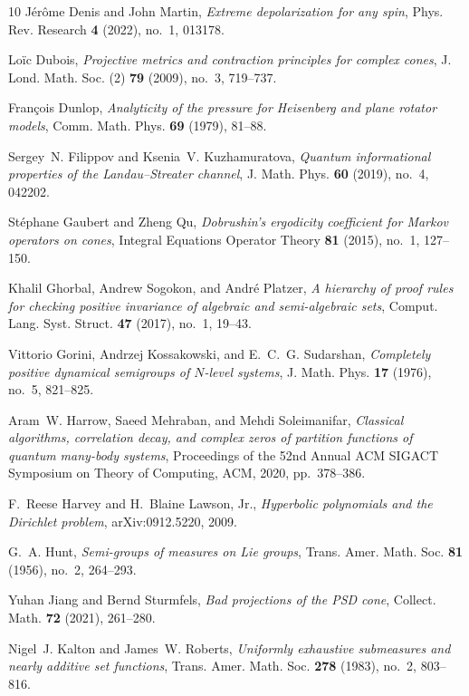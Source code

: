 \documentclass[reqno]{amsart}
\theoremstyle{definition}
\theoremstyle{remark}
\begin{document}
\begin{thebibliography}{10}
J\'{e}r\^{o}me Denis and John Martin, \emph{Extreme depolarization for any
  spin}, Phys. Rev. Research \textbf{4} (2022), no.~1, 013178.

Lo{\"i}c Dubois, \emph{Projective metrics and contraction principles for
  complex cones}, J. Lond. Math. Soc. (2) \textbf{79} (2009), no.~3, 719--737.

Fran{\c c}ois Dunlop, \emph{Analyticity of the pressure for {Heisenberg} and
  plane rotator models}, Comm. Math. Phys. \textbf{69} (1979), 81--88.

Sergey~N. Filippov and Ksenia~V. Kuzhamuratova, \emph{Quantum informational
  properties of the {Landau--Streater} channel}, J. Math. Phys. \textbf{60}
  (2019), no.~4, 042202.

St{\'e}phane Gaubert and Zheng Qu, \emph{{Dobrushin}'s ergodicity coefficient
  for {Markov} operators on cones}, Integral Equations Operator Theory
  \textbf{81} (2015), no.~1, 127--150.

Khalil Ghorbal, Andrew Sogokon, and Andr{\'e} Platzer, \emph{A hierarchy of
  proof rules for checking positive invariance of algebraic and semi-algebraic
  sets}, Comput. Lang. Syst. Struct. \textbf{47} (2017), no.~1, 19--43.

Vittorio Gorini, Andrzej Kossakowski, and E.~C.~G. Sudarshan, \emph{Completely
  positive dynamical semigroups of {$N$}-level systems}, J. Math. Phys.
  \textbf{17} (1976), no.~5, 821--825.

Aram~W. Harrow, Saeed Mehraban, and Mehdi Soleimanifar, \emph{Classical
  algorithms, correlation decay, and complex zeros of partition functions of
  quantum many-body systems}, Proceedings of the 52nd Annual {ACM SIGACT}
  Symposium on Theory of Computing, ACM, 2020, pp.~378--386.

F.~Reese Harvey and H.~Blaine Lawson, Jr., \emph{Hyperbolic polynomials and the
  {Dirichlet} problem}, arXiv:0912.5220, 2009.

G.~A. Hunt, \emph{Semi-groups of measures on {Lie} groups}, Trans. Amer. Math.
  Soc. \textbf{81} (1956), no.~2, 264--293.

Yuhan Jiang and Bernd Sturmfels, \emph{Bad projections of the {PSD} cone},
  Collect. Math. \textbf{72} (2021), 261--280.

Nigel~J. Kalton and James~W. Roberts, \emph{Uniformly exhaustive submeasures
  and nearly additive set functions}, Trans. Amer. Math. Soc. \textbf{278}
  (1983), no.~2, 803--816.


\end{thebibliography}
\end{document}
